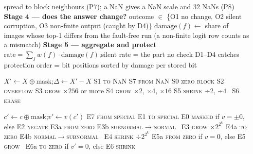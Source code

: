\documentclass[10pt,a4paper]{article}
\begin{document}
\begin{algorithm}[p]
\begin{algorithmic}[1]
 spread to block neighbours (P7); a NaN gives a NaN scale and 32 NaNs (P8)\EndIf
\Statex \textbf{Stage 4 --- does the answer change?}
\State outcome $\in$ \{O1 no change, O2 silent corruption, O3 non-finite output (caught by D4)\}
\State $\text{damage}(f) \gets$ share of images whose top-1 differs from the fault-free run
       (a non-finite logit row counts as a mismatch)
\Statex \textbf{Stage 5 --- aggregate and protect}
\State $\text{rate} = \sum_f w(f)\cdot\text{damage}(f)$;\quad silent rate = the part no check D1--D4 catches
\State protection order = bit positions sorted by damage per stored bit
\end{algorithmic}
\end{algorithm}

\begin{algorithm}[t]
\caption{\textsc{ScaleCase}: flip of scale byte $X$}
\label{alg:scale}
\small
\begin{algorithmic}[1]
\State $X' \gets X \oplus \text{mask}$;\quad $\Delta \gets X' - X$ 
 \Return S1 \textsc{to NaN} 
 \Return S7 \textsc{from NaN} 
 \Return S0 \textsc{zero block} 
 \Return S2 \textsc{overflow}
 \Return S3 \textsc{grow} $\times 256$ or more
 \Return S4 \textsc{grow} $\times 2$, $\times 4$, $\times 16$
 \Return S5 \textsc{shrink} $\div 2$, $\div 4$
\Else\ \Return S6 \textsc{erase} 
\EndIf
\end{algorithmic}
\end{algorithm}

\begin{algorithm}[t]
\caption{\textsc{ElementCase}: flip of element code $c$ with value $v$}
\label{alg:element}
\small
\begin{algorithmic}[1]
\State $c' \gets c \oplus \text{mask}$;\quad $v' \gets v(c')$
 \Return E7 \textsc{from special}
 \Return E1 \textsc{to special} 
 \Return E0 \textsc{masked} if $v=\pm 0$, else E2 \textsc{negate} 
    \Return E3a \textsc{from zero}
    \Return E3b \textsc{subnormal}$\to$\textsc{normal}
   \Else\ \Return E3 \textsc{grow} $\times 2^{2^k}$
   \EndIf
{}
    \Return E4a \textsc{to zero}
    \Return E4b \textsc{normal}$\to$\textsc{subnormal}
   \Else\ \Return E4 \textsc{shrink} $\div 2^{2^k}$
   \EndIf
{} \Return E5a \textsc{from zero} if $v = 0$, else E5 \textsc{grow}
\Else\ \Return E6a \textsc{to zero} if $v' = 0$, else E6 \textsc{shrink}
\EndIf
\end{algorithmic}
\end{algorithm}
\end{document}
